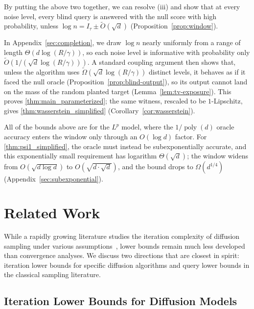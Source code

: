 \documentclass[11pt,letterpaper]{article}
\DeclareMathOperator*{\poly}{poly}
\newcommand{\1}{\mathbbm{1}}
\begin{document}
By putting the above two together, we can resolve (iii) and show that at
every noise level, every blind query is answered with the null score with
high probability, unless $\log n=I_\tau\pm\widetilde O(\sqrt d)$
(Proposition~\ref{prop:window}).

In Appendix~\ref{sec:completion}, we draw $\log n$ nearly uniformly from a
range of length $\Theta(d\log(R/\gamma))$, so each noise level is
informative with probability only $\widetilde O(1/(\sqrt d\log(R/\gamma)))$.
A standard coupling argument then shows that, unless the algorithm uses
$\widetilde\Omega(\sqrt d\log(R/\gamma))$ distinct levels, it behaves as if
it faced the null oracle (Proposition~\ref{prop:blind-output}), so its
output cannot land on the mass of the random planted target
(Lemma~\ref{lem:tv-exposure}).  This
proves \cref{thm:main_parameterized}; the same witness, rescaled to be
$1$-Lipschitz, gives \cref{thm:wasserstein_simplified}
(Corollary~\ref{cor:wasserstein}).

All of the bounds above are for the $L^p$ model, where the $1/\poly(d)$
oracle accuracy enters the window only through an $O(\log d)$ factor.  For
\cref{thm:psi1_simplified}, the oracle must instead be subexponentially
accurate, and this exponentially small requirement has logarithm
$\Theta(\sqrt d)$; the window widens from $O(\sqrt{d\log d})$ to
$O(\sqrt{d\cdot\sqrt d})$, and the bound drops to $\Omega(d^{1/4})$
(Appendix~\ref{sec:subexponential}).


\section{Related Work}
\label{sec:related}

While a rapidly growing literature studies the iteration complexity of diffusion sampling under various assumptions~\cite{chen2022samplingiseasy, debortoli2022convergence, conforti2023score,lee2022polynomialcomplexity, chen2023probability,lee2023convergence,chen2023improved, chen2023restoration, li2024sharp, li2024accelerating, wu2024stochasticrk, gao2025wasserstein}, lower bounds remain much less developed than convergence analyses.
We discuss two directions that are closest in spirit: 
iteration lower bounds for specific diffusion algorithms and query lower bounds in the classical sampling literature.

\subsection{Iteration Lower Bounds for Diffusion Models}
\label{sec:diffusion_lower}
\end{document}
